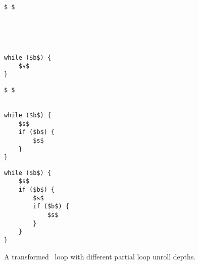 \begin{figure}[ht]
    \newsavebox{\whilefirstlstbox}
    \begin{lrbox}{\whilefirstlstbox}
        \begin{lstlisting}
$ $





while ($b$) {
    $s$
}
        \end{lstlisting}
    \end{lrbox}

    \newsavebox{\whilesecondlstbox}
    \begin{lrbox}{\whilesecondlstbox}
        \begin{lstlisting}
$ $


while ($b$) {
    $s$
    if ($b$) {
        $s$
    }
}
        \end{lstlisting}
    \end{lrbox}

    \newsavebox{\whilethirdlstbox}
    \begin{lrbox}{\whilethirdlstbox}
        \begin{lstlisting}
while ($b$) {
    $s$
    if ($b$) {
        $s$
        if ($b$) {
            $s$
        }
    }
}
        \end{lstlisting}
    \end{lrbox}
    \centering
    \caption{%
        A transformed \whilelit~loop with different partial loop unroll depths.
    }\label{po:lst:loop_unroll}
\end{figure}


